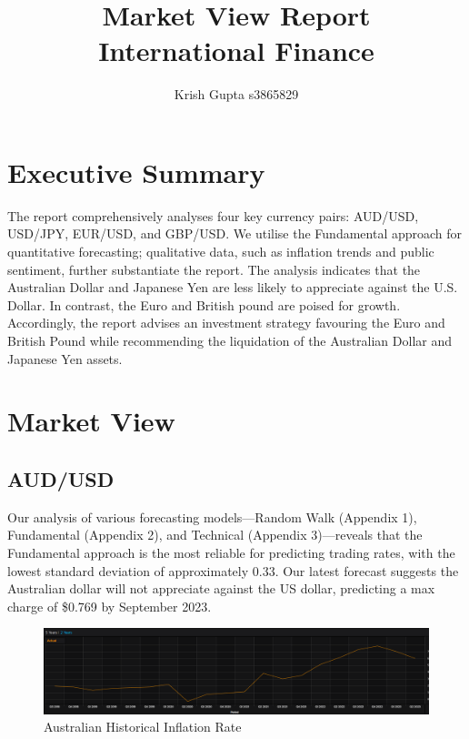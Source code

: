 \documentclass{article}
\title{Market View Report\\
        International Finance}
\author{Krish Gupta s3865829}
\let\Oldsubsection\subsection
\renewcommand{\subsection}{\FloatBarrier\Oldsubsection}
\begin{document}
\maketitle

\tableofcontents
\pagebreak

\section*{Executive Summary}
The report comprehensively analyses four key currency pairs: AUD/USD, USD/JPY, EUR/USD, and GBP/USD. We utilise the Fundamental approach for quantitative forecasting; qualitative data, such as inflation trends and public sentiment, further substantiate the report. The analysis indicates that the Australian Dollar and Japanese Yen are less likely to appreciate against the U.S. Dollar. In contrast, the Euro and British pound are poised for growth. Accordingly, the report advises an investment strategy favouring the Euro and British Pound while recommending the liquidation of the Australian Dollar and Japanese Yen assets.

\section*{Market View}

\subsection*{AUD/USD}

Our analysis of various forecasting models—Random Walk (Appendix 1), Fundamental (Appendix 2), and Technical (Appendix 3)—reveals that the Fundamental approach is the most reliable for predicting trading rates, with the lowest standard deviation of approximately 0.33. Our latest forecast suggests the Australian dollar will not appreciate against the US dollar, predicting a max charge of \$0.769 by September 2023.

\begin{figure}[h!]
    \centering
    \includegraphics[scale=0.35]{graphs/AUDinflation-historical.png}
    \caption{Australian Historical Inflation Rate}
    \label{Australian Historical Inflation Rate}
\end{figure}
\end{document}
